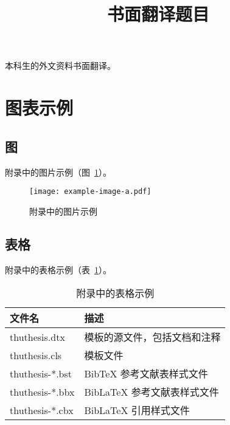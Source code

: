 

\begin{translation}
\label{cha:translation}

\title{书面翻译题目}
\maketitle

\tableofcontents


本科生的外文资料书面翻译。


\section{图表示例}

\subsection{图}

附录中的图片示例（图~\ref{fig:appendix-translation-figure}）。

\begin{figure}
  \centering
  \texttt{[image: example-image-a.pdf]}
  \caption{附录中的图片示例}
  \label{fig:appendix-translation-figure}
\end{figure}


\subsection{表格}

附录中的表格示例（表~\ref{tab:appendix-translation-table}）。

\begin{table}
  \centering
  \caption{附录中的表格示例}
  \begin{tabular}{ll}
    \toprule
    文件名          & 描述                         \\
    \midrule
    thuthesis.dtx   & 模板的源文件，包括文档和注释 \\
    thuthesis.cls   & 模板文件                     \\
    thuthesis-*.bst & BibTeX 参考文献表样式文件    \\
    thuthesis-*.bbx & BibLaTeX 参考文献表样式文件  \\
    thuthesis-*.cbx & BibLaTeX 引用样式文件        \\
    \bottomrule
  \end{tabular}
  \label{tab:appendix-translation-table}
\end{table}



\end{translation}

